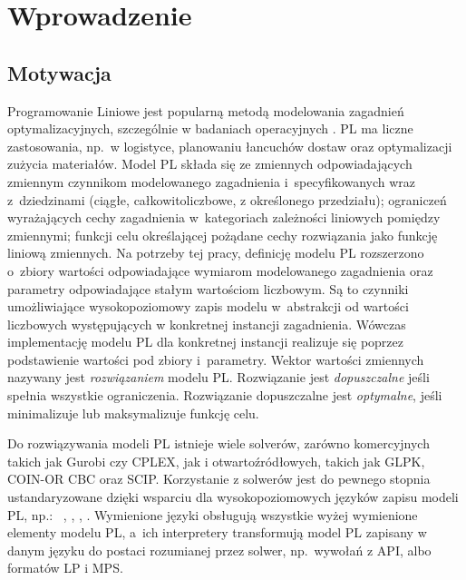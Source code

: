 
\chapter{Wprowadzenie}\label{ch:intro}

\section{Motywacja}\label{sec:intro:motivation}

Programowanie Liniowe  jest popularną metodą modelowania zagadnień optymalizacyjnych, szczególnie w badaniach operacyjnych \cite{williams2013model}. PL ma liczne zastosowania, np.~w logistyce, planowaniu łancuchów dostaw oraz optymalizacji zużycia materiałów.\cite{dantzig2002linear} %
Model PL składa się ze zmiennych odpowiadających zmiennym czynnikom modelowanego zagadnienia i~specyfikowanych wraz z~dziedzinami (ciągłe, całkowitoliczbowe, z określonego przedziału); ograniczeń wyrażających cechy zagadnienia w~kategoriach zależności liniowych pomiędzy zmiennymi; funkcji celu określającej pożądane cechy rozwiązania jako funkcję liniową zmiennych. Na potrzeby tej pracy, definicję modelu PL rozszerzono o~zbiory wartości odpowiadające wymiarom modelowanego zagadnienia oraz parametry odpowiadające stałym wartościom liczbowym. Są to czynniki umożliwiające wysokopoziomowy zapis modelu w~abstrakcji od wartości liczbowych występujących w konkretnej instancji zagadnienia. Wówczas implementację modelu PL dla konkretnej instancji realizuje się poprzez podstawienie wartości pod zbiory i~parametry.
Wektor wartości zmiennych nazywany jest \emph{rozwiązaniem} modelu PL. Rozwiązanie jest \emph{dopuszczalne} jeśli spełnia wszystkie ograniczenia. Rozwiązanie dopuszczalne jest \emph{optymalne}, jeśli minimalizuje lub maksymalizuje funkcję celu.

Do rozwiązywania modeli PL istnieje wiele solverów, zarówno komercyjnych takich jak Gurobi\cite{gurobi2023} czy CPLEX\cite{cplex2019}, jak i otwartoźródłowych, takich jak GLPK\cite{glpk2023}, COIN-OR CBC\cite{cbc2023} oraz SCIP\cite{scip2023}. %
Korzystanie z solwerów jest do pewnego stopnia ustandaryzowane dzięki wsparciu dla wysokopoziomowych języków zapisu modeli PL, np.:~ \cite{fourer2003ampl},  \cite{gams2019},  \cite{zimpl_manual},  \cite{nethercote2007minizinc}. Wymienione języki obsługują wszystkie wyżej wymienione elementy modelu PL, a~ich interpretery transformują model PL zapisany w danym języku do postaci rozumianej przez solwer, np.~wywołań z API, albo formatów LP i MPS.

